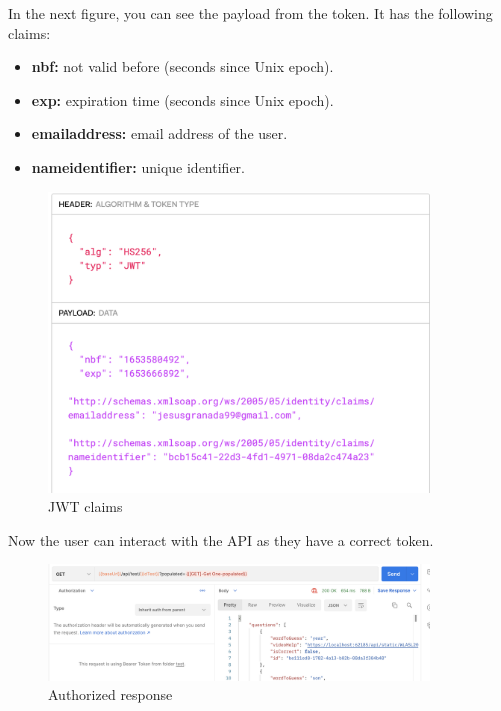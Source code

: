             In the next figure, you can see the payload from the token. It has the following claims:
            \begin{itemize}[noitemsep]
                \item \textbf{nbf:} not valid before (seconds since Unix epoch).
                \item \textbf{exp:} expiration time (seconds since Unix epoch).
                \item \textbf{emailaddress:} email address of the user.
                \item \textbf{nameidentifier:} unique identifier.
            \end{itemize}
            \begin{figure}[H]
                \centering
                    \includegraphics[width=0.9\textwidth]{assets/jwt.io.png}
                \caption{JWT claims}
                \label{fig:user_jwtclaims}
            \end{figure}

            Now the user can interact with the API as they have a correct token.
            \begin{figure}[H]
                \centering
                    \includegraphics[width=0.9\textwidth]{assets/authorized.png}
                \caption{Authorized response}
                \label{fig:user_authorized}
            \end{figure}

